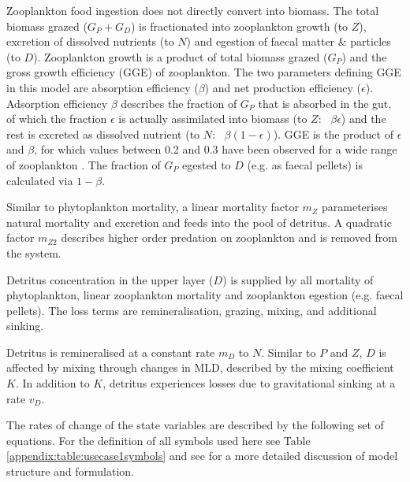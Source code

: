 \documentclass[journal abbreviation, manuscript]{copernicus}
\begin{document}
Zooplankton food ingestion does not directly convert into biomass. The total biomass grazed ($G_P + G_D$) is fractionated into zooplankton growth (to $Z$), excretion of dissolved nutrients (to $N$) and egestion of faecal matter \& particles (to $D$). Zooplankton growth is a product of total biomass grazed ($G_P$) and the gross growth efficiency (GGE) of zooplankton. The two parameters defining GGE in this model are absorption efficiency ($\beta$) and net production efficiency ($\epsilon$). Adsorption efficiency $\beta$ describes the fraction of $G_P$ that is absorbed in the gut, of which the fraction $\epsilon$ is actually assimilated into biomass (to $Z$: \ $\beta \epsilon$) and the rest is excreted as dissolved nutrient (to $N$: \ $\beta (1-\epsilon)$). GGE is the product of $\epsilon$ and $\beta$, for which values between 0.2 and 0.3 have been observed for a wide range of zooplankton \citep{Straile1997GrossGroup}. The fraction of $G_P$ egested to $D$ (e.g. as faecal pellets) is calculated via $1-\beta$. 

Similar to phytoplankton mortality, a linear mortality factor $m_Z$ parameterises natural mortality and excretion and feeds into the pool of detritus. A quadratic factor $m_{Z2}$ describes higher order predation on zooplankton and is removed from the system. 

Detritus concentration in the upper layer ($D$) is supplied by all mortality of phytoplankton, linear zooplankton mortality and zooplankton egestion (e.g. faecal pellets). The loss terms are remineralisation, grazing, mixing, and additional sinking. 

Detritus is remineralised at a constant rate $m_D$ to $N$. Similar to $P$ and $Z$, $D$ is affected by mixing through changes in MLD, described by the mixing coefficient $K$. In addition to $K$, detritus experiences losses due to gravitational sinking at a rate $v_D$. 

The rates of change of the state variables are described by the following set of equations. For the definition of all symbols used here see Table \ref{appendix:table:usecase1symbols} and see \citet{Anderson2015c} for a more detailed discussion of model structure and formulation.
\end{document}
